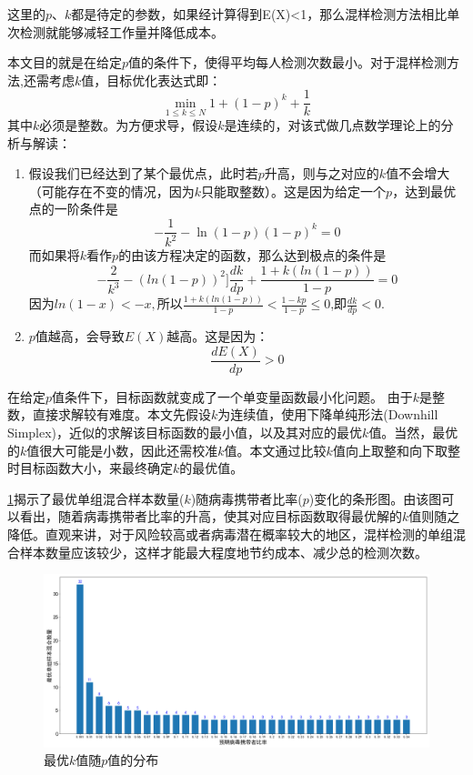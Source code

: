 \documentclass[withoutpre]{cumcmthesis} %
\begin{document}
这里的$p$、$k$都是待定的参数，如果经计算得到E(X)<1，那么混样检测方法相比单次检测就能够减轻工作量并降低成本。

本文目的就是在给定$p$值的条件下，使得平均每人检测次数最小。对于混样检测方法,还需考虑$k$值，目标优化表达式即：
\begin{equation}
    \min_{1\leqslant k\leqslant N}  1+(1-p)^k+\frac{1}{k}
    \label{euqation:target}
\end{equation}
其中$k$必须是整数。为方便求导，假设$k$是连续的，对该式做几点数学理论上的分析与解读：\\

\begin{enumerate}
    \item 假设我们已经达到了某个最优点，此时若$p$升高，则与之对应的$k$值不会增大（可能存在不变的情况，因为$k$只能取整数）。这是因为给定一个$p$，达到最优点的一阶条件是
    \begin{equation}
        -\frac{1}{k^2}-\ln(1-p)(1-p)^k=0
    \end{equation}
    而如果将$k$看作$p$的由该方程决定的函数，那么达到极点的条件是
    \begin{equation}
        -\frac{2}{k^3}-(ln(1-p))^2]\frac{dk}{dp}+\frac{1+k(ln(1-p))}{1-p}=0
    \end{equation}
    因为$ln(1-x)<-x,$所以$\displaystyle\frac{1+k(ln(1-p))}{1-p}<\frac{1-kp}{1-p}\leqslant0$,即$\displaystyle\frac{dk}{dp}<0.$
    \item $p$值越高，会导致$E(X)$越高。这是因为：
    \begin{equation}
        \displaystyle\frac{dE(X)}{dp}>0
    \end{equation}          
\end{enumerate}


在给定$p$值条件下，目标函数\label{equation:target}就变成了一个单变量函数最小化问题。
由于$k$是整数，直接求解较有难度。本文先假设$k$为连续值，使用下降单纯形法(Downhill Simplex)，近似的求解该目标函数的最小值，以及其对应的最优$k$值。当然，最优的$k$值很大可能是小数，因此还需校准$k$值。本文通过比较$k$值向上取整和向下取整时目标函数大小，来最终确定$k$的最优值。


\cref{fig:k}揭示了最优单组混合样本数量($k$)随病毒携带者比率($p$)变化的条形图。由该图可以看出，随着病毒携带者比率的升高，使其对应目标函数取得最优解的$k$值则随之降低。直观来讲，对于风险较高或者病毒潜在概率较大的地区，混样检测的单组混合样本数量应该较少，这样才能最大程度地节约成本、减少总的检测次数。
\begin{figure}[!h]
    \centering
    \includegraphics[width=1.0\textwidth]{figures/optimize_pool_size.png}
    \caption{最优$k$值随$p$值的分布}
    \label{fig:k}
\end{figure}
\end{document}
